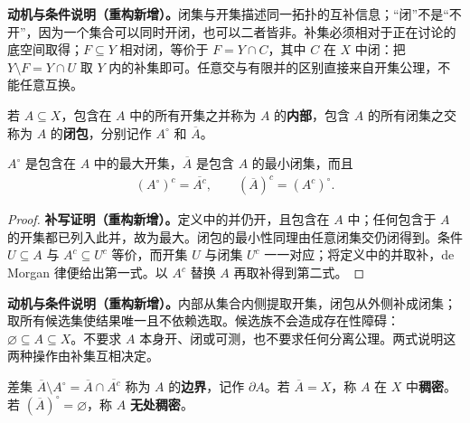 \documentclass[../../main.tex]{subfiles}%
\begin{document}
\begin{remark}
\textbf{动机与条件说明（重构新增）。}闭集与开集描述同一拓扑的互补信息；“闭”不是“不开”，因为一个集合可以同时开闭，也可以二者皆非。补集必须相对于正在讨论的底空间取得；$F\subseteq Y$ 相对闭，等价于 $F=Y\cap C$，其中 $C$ 在 $X$ 中闭：把 $Y\setminus F=Y\cap U$ 取 $Y$ 内的补集即可。任意交与有限并的区别直接来自开集公理，不能任意互换。
\end{remark}
\begin{definition}[内部与闭包]\label{definition:ch04-interior-closure}
若 $A\subseteq X$，包含在 $A$ 中的所有开集之并称为 $A$ 的\textbf{内部}，包含 $A$ 的所有闭集之交称为 $A$ 的\textbf{闭包}，分别记作 $A^\circ$ 和 $\overline A$。
\end{definition}
\begin{proposition}\label{proposition:ch04-interior-closure-properties}
$A^\circ$ 是包含在 $A$ 中的最大开集，$\overline A$ 是包含 $A$ 的最小闭集，而且
\begin{align*}
(A^\circ)^c=\overline{A^c},\qquad (\overline A)^c=(A^c)^\circ.
\end{align*}
\end{proposition}
\begin{proof}
\textbf{补写证明（重构新增）。}定义中的并仍开，且包含在 $A$ 中；任何包含于 $A$ 的开集都已列入此并，故为最大。闭包的最小性同理由任意闭集交仍闭得到。条件 $U\subseteq A$ 与 $A^c\subseteq U^c$ 等价，而开集 $U$ 与闭集 $U^c$ 一一对应；将定义中的并取补，de Morgan 律便给出第一式。以 $A^c$ 替换 $A$ 再取补得到第二式。
\end{proof}
\begin{remark}
\textbf{动机与条件说明（重构新增）。}内部从集合内侧提取开集，闭包从外侧补成闭集；取所有候选集使结果唯一且不依赖选取。候选族不会造成存在性障碍：$\varnothing\subseteq A\subseteq X$。不要求 $A$ 本身开、闭或可测，也不要求任何分离公理。两式说明这两种操作由补集互相决定。
\end{remark}
\begin{definition}[边界、稠密与无处稠密]\label{definition:ch04-boundary-density}
差集 $\overline A\setminus A^\circ=\overline A\cap\overline{A^c}$ 称为 $A$ 的\textbf{边界}，记作 $\partial A$。若 $\overline A=X$，称 $A$ 在 $X$ 中\textbf{稠密}。若 $(\overline A)^\circ=\varnothing$，称 $A$ \textbf{无处稠密}。
\end{definition}
\end{document}
